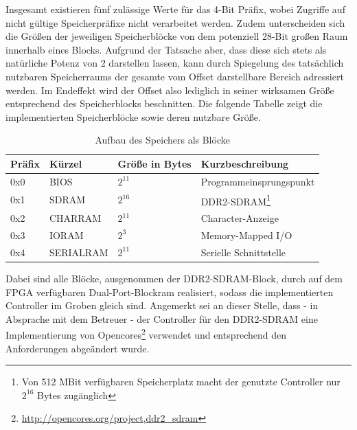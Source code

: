 Insgesamt existieren f\"unf zul\"assige Werte f\"ur das 4-Bit Pr\"afix, wobei Zugriffe auf nicht g\"ultige Speicherpr\"afixe nicht verarbeitet werden. Zudem unterscheiden sich die Gr\"o\ss{}en der jeweiligen Speicherbl\"ocke von dem potenziell 28-Bit gro\ss{}en Raum innerhalb eines Blocks. Aufgrund der Tatsache aber, dass diese sich stets als nat\"urliche Potenz von 2 darstellen lassen, kann durch Spiegelung des tats\"achlich nutzbaren Speicherraums der gesamte vom Offset darstellbare Bereich adressiert werden. Im Endeffekt wird der Offset also lediglich in seiner wirksamen Gr\"o\ss{}e entsprechend des Speicherblocks beschnitten. Die folgende Tabelle zeigt die implementierten Speicherbl\"ocke sowie deren nutzbare Gr\"o\ss{}e.

\begin{table}[H]
	\begin{center}
	\label{tab:ramlayout}
	\begin{tabular}{| l | l | l | l |}
		\hline
		Pr\"afix & K\"urzel & Gr\"o\ss{}e in Bytes & Kurzbeschreibung \\ \hline
		0x0 & BIOS & $2^{11}$ & Programmeinsprungspunkt \\ \hline

		0x1 & SDRAM & $2^{16}$ & DDR2-SDRAM\footnote{Von 512 MBit verf\"ugbaren Speicherplatz macht der genutzte Controller nur $2^{16}$ Bytes zug\"anglich} \\ \hline
		0x2 & CHARRAM & $2^{11}$ & Character-Anzeige \\ \hline
		0x3 & IORAM & $2^{3}$ & Memory-Mapped I/O \\ \hline
		0x4 & SERIALRAM & $2^{11}$ & Serielle Schnittstelle \\ \hline
	\end{tabular}
	\end{center}
	\caption{Aufbau des Speichers als Bl\"ocke}
\end{table}

Dabei sind alle Bl\"ocke, ausgenommen der DDR2-SDRAM-Block, durch auf dem FPGA ver\-f\"ug\-baren Dual-Port-Block\-ram realisiert, sodass die implementierten Controller im Groben gleich sind. Angemerkt sei an dieser Stelle, dass - in Absprache mit dem Betreuer - der Controller f\"ur den DDR2-SDRAM eine Implementierung von Opencores\footnote{\url{http://opencores.org/project,ddr2_sdram}} verwendet und entsprechend den Anforderungen abge\"andert wurde.

